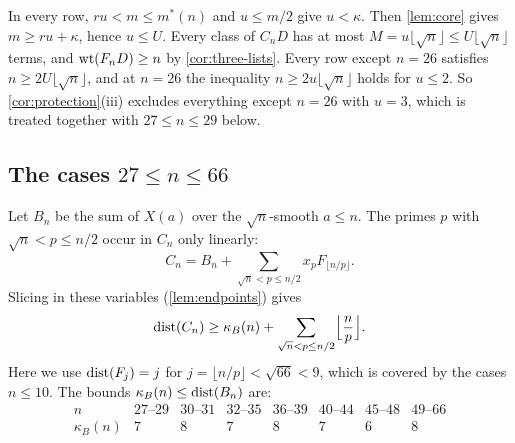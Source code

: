 In every row, $ru<m\le m^*(n)$ and $u\le m/2$ give $u<\kappa$. Then \cref{lem:core} gives $m\ge ru+\kappa$, hence $u\le U$. Every class of $C_nD$ has at most $M=u\lfloor\sqrt n\rfloor\le U\lfloor\sqrt n\rfloor$ terms, and $\operatorname{wt}(F_nD)\ge n$ by \cref{cor:three-lists}. Every row except $n=26$ satisfies $n\ge2U\lfloor\sqrt n\rfloor$, and at $n=26$ the inequality $n\ge2u\lfloor\sqrt n\rfloor$ holds for $u\le2$. So \cref{cor:protection}(iii) excludes everything except $n=26$ with $u=3$, which is treated together with $27\le n\le29$ below.

\subsection{The cases \texorpdfstring{$27\le n\le66$}{27 <= n <= 66}}
Let $B_n$ be the sum of $X(a)$ over the $\sqrt n$-smooth $a\le n$. The primes $p$ with $\sqrt n<p\le n/2$ occur in $C_n$ only linearly:
\[
 C_n=B_n+\sum_{\sqrt n<p\le n/2}x_pF_{\lfloor n/p\rfloor}.
\]
Slicing in these variables (\cref{lem:endpoints}) gives
\begin{equation}\label{eq:core-sum}
 \operatorname{dist}(C_n)\ge\kappa_B(n)+\sum_{\sqrt n<p\le n/2}\Bigl\lfloor\frac np\Bigr\rfloor .
\end{equation}
Here we use $\operatorname{dist}(F_j)=j$ for $j=\lfloor n/p\rfloor<\sqrt{66}<9$, which is covered by the cases $n\le10$. The bounds $\kappa_B(n)\le\operatorname{dist}(B_n)$ are:
\[
\begin{array}{c|ccccccc}
n&27\text{--}29&30\text{--}31&32\text{--}35&36\text{--}39&40\text{--}44&45\text{--}48&49\text{--}66\\\hline
\kappa_B(n)&7&8&7&8&7&6&8
\end{array}
\]

